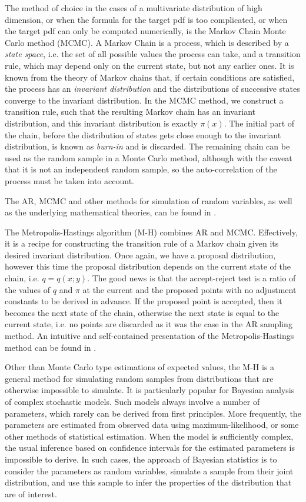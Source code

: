 \documentclass[11pt,letterpaper]{article}       %
\begin{document}
The method of choice in the cases of a multivariate distribution of high
dimension, or when the formula for the target pdf is too complicated, or when
the target pdf can only be computed numerically, is the Markov Chain Monte
Carlo method (MCMC).  A Markov Chain is a process, which is described by a
\emph{state space}, i.e. the set of all possible values the process can take,
and a transition rule, which may depend only on the current state, but not any
earlier ones. It is known from the theory of Markov chains that, if certain
conditions are satisfied, the process has an \emph{invariant distribution} and
the distributions of successive states converge to the invariant distribution.
In the MCMC method, we construct a transition rule, such that the resulting
Markov chain has an invariant distribution, and this invariant distribution is
exactly $\pi(x)$.  The initial part of the chain, before the distribution of
states gets close enough to the invariant distribution, is known as
\emph{burn-in} and is discarded.  The remaining chain can be used as the random
sample in a Monte Carlo method, although with the caveat that it is not an
independent random sample, so the auto-correlation of the process must be taken
into account.  

The AR, MCMC and other methods for simulation of random variables, as well as
the underlying mathematical theories, can be found in \cite{ross.simulation}.


The Metropolis-Hastings algorithm (M-H) combines AR and MCMC.  Effectively, it
is a recipe for constructing the transition rule of a Markov chain given its
desired invariant distribution.  Once again, we have a proposal distribution,
however this time the proposal distribution depends on the current state of the
chain, i.e. $q=q(x;y)$. The good news is that the accept-reject test is a ratio
of the values of $q$ and $\pi$ at the current and the proposed points with no
adjustment constants to be derived in advance.  If the proposed point is
accepted, then it becomes the next state of the chain, otherwise the next state
is equal to the current state, i.e. no points are discarded as it was the case
in the AR sampling method.  An intuitive and self-contained presentation of the
Metropolis-Hastings method can be found in \cite{understanding.MH}.

Other than Monte Carlo type estimations of expected values, the M-H is a
general method for simulating random samples from distributions that are
otherwise impossible to simulate.  It is particularly popular for Bayesian
analysis of complex stochastic models.  Such models always involve a number of
parameters, which rarely can be derived from first principles.  More
frequently, the parameters are estimated from observed data using
maximum-likelihood, or some other methods of statistical estimation.  When the
model is sufficiently complex, the usual inference based on confidence
intervals for the estimated parameters is impossible to derive.  In such cases,
the approach of Bayesian statistics is to consider the parameters as random
variables,  simulate a sample from their joint distribution, and use this
sample to infer the properties of the distribution that are of interest.
\end{document}

